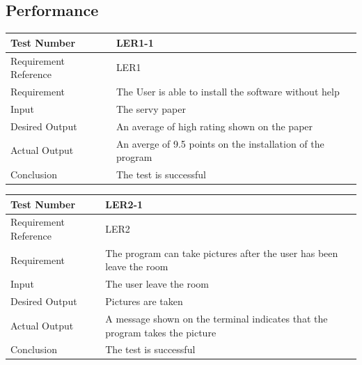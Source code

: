 \documentclass[12pt, titlepage]{article}
\begin{document}
\subsection{Performance}
\begin{table}[H]
\begin{center}
\begin{tabular}{|l | m{9cm}|}
\hline
  Test Number & LER1-1\\
  \hline
  Requirement Reference & LER1\\
  \hline
  Requirement & The User is able to install the software without help\\
  \hline
  Input & The servy paper\\
  \hline
  Desired Output & An average of high rating shown on the paper\\
  \hline
  Actual Output & An averge of 9.5 points on the installation of the program\\
  \hline
  Conclusion & The test is successful\\
  \hline
\end{tabular}
\end{center}           
\end{table}

\begin{table}[H]
\begin{center}
\begin{tabular}{|l | m{9cm}|}
\hline
  Test Number & LER2-1\\
  \hline
  Requirement Reference & LER2\\
  \hline
  Requirement & The program can take pictures after the user has been leave the room\\
  \hline
  Input & The user leave the room\\
  \hline
  Desired Output & Pictures are taken\\
  \hline
  Actual Output & A message shown on the terminal indicates that the program takes the picture\\
  \hline
  Conclusion & The test is successful\\
  \hline
\end{tabular}
\end{center}           
\end{table}
\end{document}
